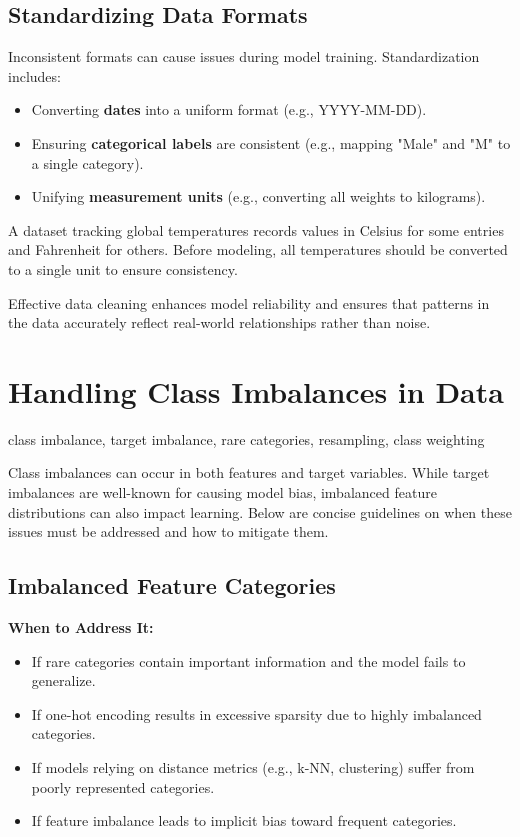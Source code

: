 \documentclass[12pt,openany]{book}
\begin{document}
\subsection{Standardizing Data Formats}
Inconsistent formats can cause issues during model training. Standardization includes:

\begin{itemize}
    \item Converting \textbf{dates} into a uniform format (e.g., YYYY-MM-DD).
    \item Ensuring \textbf{categorical labels} are consistent (e.g., mapping "Male" and "M" to a single category).
    \item Unifying \textbf{measurement units} (e.g., converting all weights to kilograms).
\end{itemize}

\begin{examplebox}
A dataset tracking global temperatures records values in Celsius for some entries and Fahrenheit for others. Before modeling, all temperatures should be converted to a single unit to ensure consistency.
\end{examplebox}

Effective data cleaning enhances model reliability and ensures that patterns in the data accurately reflect real-world relationships rather than noise. \newline



\section{Handling Class Imbalances in Data}

\begin{keywordsbox}
class imbalance, target imbalance, rare categories, resampling, class weighting
\end{keywordsbox}


Class imbalances can occur in both features and target variables. While target imbalances are well-known for causing model bias, imbalanced feature distributions can also impact learning. Below are concise guidelines on when these issues must be addressed and how to mitigate them.

\subsection{Imbalanced Feature Categories}

\textbf{When to Address It:}
\begin{itemize}
    \item If rare categories contain important information and the model fails to generalize.
    \item If one-hot encoding results in excessive sparsity due to highly imbalanced categories.
    \item If models relying on distance metrics (e.g., k-NN, clustering) suffer from poorly represented categories.
    \item If feature imbalance leads to implicit bias toward frequent categories.
\end{itemize}
\end{document}

